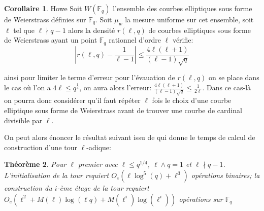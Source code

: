 \documentclass[10pt,a4paper]{book}
\theoremstyle{plain}
\newtheorem{thm}{Théorème}
\theoremstyle{definition}
\theoremstyle{definition}
\newtheorem{cor}[thm]{Corollaire}
\theoremstyle{definition}
\theoremstyle{definition}
\theoremstyle{remark}
\theoremstyle{remark}
\begin{document}
\begin{cor}{Howe}
\label{cor:Howe:densite}
Soit $W(\mathbb{F}_q)$ l'ensemble des courbes elliptiques sous forme de Weierstrass définies sur $\mathbb{F}_q$. Soit $\mu_w$ la mesure uniforme sur cet ensemble, soit $\ell$  tel que $\ell \nmid q-1$ alors la densité $r(\ell,q)$ de courbes elliptiques sous forme de Weierstrass ayant un point $\mathbb{F}_q$ rationnel d'ordre $\ell$ vérifie:
\begin{equation*}
|r(\ell,q)-\frac{1}{\ell-1}| \leqslant \frac{4\ell(\ell+1)}{(\ell-1)\sqrt{q}}
\end{equation*}
\end{cor}
ainsi pour limiter le terme d'erreur pour l'évauation de $r(\ell,q)$ on se place dans le cas où l'on a $4\ell \leqslant q^{\frac{1}{4}}$, on aura alors l'erreur: $\frac{4\ell(\ell+1)}{(\ell-1)\sqrt{q}} \leqslant \frac{1}{2 \ell} $. Dans ce cas-là on pourra donc considérer qu'il faut répéter $\ell$ fois le choix d'une courbe elliptique sous forme de Weierstrass avant de trouver une courbe de cardinal divisible par $\ell$.

On peut alors énoncer le résultat suivant issu de \cite{DeFeo-Doliskani-Schost13} qui donne le temps de calcul de construction d'une tour $\ell$-adique:

\begin{thm}
Pour $\ell$ premier avec $\ell \leqslant q^{1/4}$, $\ell \wedge q = 1$ et $\ell \nmid q-1$. L'initialisation de la tour requiert $O_e(\ell \log^5(q)+\ell^3)$ opérations binaires; la construction du $i$-ème étage de la tour requiert $O_e(\ell^2+M(\ell)\log(\ell q)+M(\ell^i)\log(\ell^i))$ opérations sur $\mathbb{F}_q$
\end{thm} 
\end{document}
